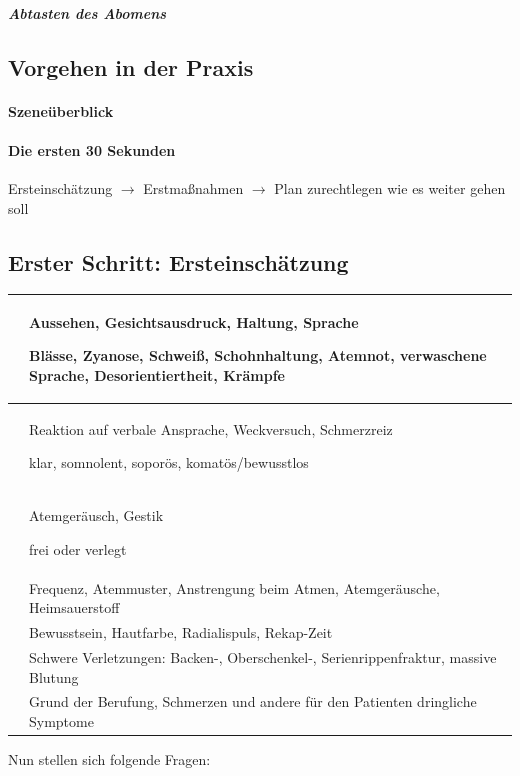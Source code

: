 \subparagraph{Abtasten des Abomens }
\clearpage
\subsection{Vorgehen in der Praxis}

\paragraph{Szene\"uberblick}
\paragraph[Die ersten \ \ 30 Sekunden ]{Die ersten  30 Sekunden }
Ersteinsch\"atzung ${\rightarrow}$  Erstma{\ss}nahmen ${\rightarrow}$ 
Plan zurechtlegen wie es weiter gehen soll

\subsection{Erster Schritt: Ersteinsch\"atzung}
\begin{center}
\begin{tabulary}{\linewidth}[H]{CL}
\toprule\midrule
 &
Aussehen, Gesichtsausdruck, Haltung, Sprache

Bl\"asse, Zyanose, Schwei{\ss}, Schohnhaltung, Atemnot, verwaschene
Sprache, Des\-orientiertheit, Kr\"ampfe 
\\\hline
 &
Reaktion auf verbale Ansprache, Weckversuch, Schmerzreiz

klar, somnolent, sopor\"os, komat\"os/bewusstlos
\\\hline
 &
Atemger\"ausch, Gestik

frei oder verlegt
\\\hline
 &
Frequenz, Atemmuster, Anstrengung beim Atmen, Atemger\"ausche,
Heimsauerstoff
\\\hline
 &
Bewusstsein, Hautfarbe, Radialispuls, Rekap-Zeit
\\\hline
 &
Schwere Verletzungen: Backen-, Oberschenkel-, Serienrippenfraktur,
massive Blutung
\\\hline
 &
Grund der Berufung, Schmerzen und andere f\"ur den Patienten dringliche
Symptome
\\\hline
\end{tabulary}
\end{center}
Nun stellen sich folgende Fragen:

